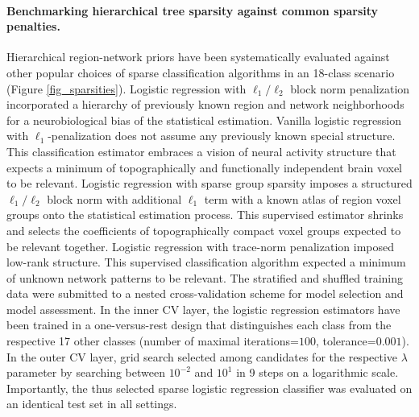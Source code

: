 \documentclass{article}
\begin{document}
\paragraph{Benchmarking hierarchical tree sparsity against
common sparsity penalties.}
Hierarchical region-network priors have been systematically
evaluated against other popular choices of sparse classification algorithms
in an 18-class scenario
(Figure \ref{fig_sparsities}).
%
Logistic regression with $\ell_1/\ell_2$ block norm penalization
incorporated a hierarchy of previously known region and network neighborhoods
for a neurobiological bias of the statistical estimation.
%
Vanilla logistic regression with $\ell_1$-penalization
does not assume any previously known special structure.
This classification estimator embraces a vision of neural activity structure
that expects a minimum of
topographically and functionally independent brain voxel to be relevant.
%
Logistic regression with sparse group sparsity
imposes a structured $\ell_1/\ell_2$ block norm with additional $\ell_1$ term
with a known atlas of region voxel groups onto the statistical estimation process.
This supervised estimator shrinks and selects the coefficients
of topographically compact voxel groups expected to be relevant together.
%
Logistic regression with trace-norm penalization
imposed low-rank structure.
This supervised classification algorithm
expected a minimum of unknown network patterns
to be relevant.
%
The stratified and shuffled training data were submitted
to a nested cross-validation scheme
for model selection and model assessment.
In the inner CV layer, the logistic regression estimators
have been trained in a one-versus-rest design that
distinguishes each class from
the respective 17 other classes
(number of maximal iterations=$100$, tolerance=$0.001$).
In the outer CV layer, grid search
selected among candidates for the respective $\lambda$ parameter
by searching between $10^{-2}$ and $10^{1}$ in 9 steps on a logarithmic scale.
Importantly, the thus selected sparse logistic regression classifier was
evaluated on an identical test set in all settings.
\end{document}
